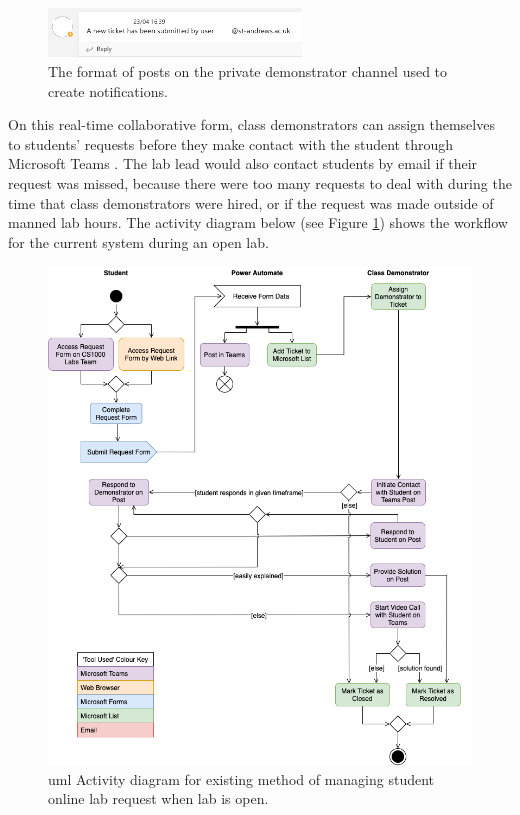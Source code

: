 \FloatBarrier
\begin{figure}[H]
  \centering
  \includegraphics[width=0.6\textwidth]{2context/images/teams2b.png}
  \caption{The format of posts on the private demonstrator channel used to create notifications.}
\end{figure}

On this real-time collaborative form, class demonstrators can assign themselves to students' requests before they make contact with the student through Microsoft Teams \cite{teams}. The lab lead would also contact students by email if their request was missed, because there were too many requests to deal with during the time that class demonstrators were hired, or if the request was made outside of manned lab hours. The activity diagram below (see Figure \ref{fig:activdiagram}) shows the workflow for the current system during an open lab.

\FloatBarrier
\begin{figure}[H]
  \centering
  \includegraphics[width=\textwidth]{2context/images/activityRevised.png}
  \caption{\gls{uml} Activity diagram for existing method of managing student online lab request when lab is open.}
  \label{fig:activdiagram}
\end{figure}


